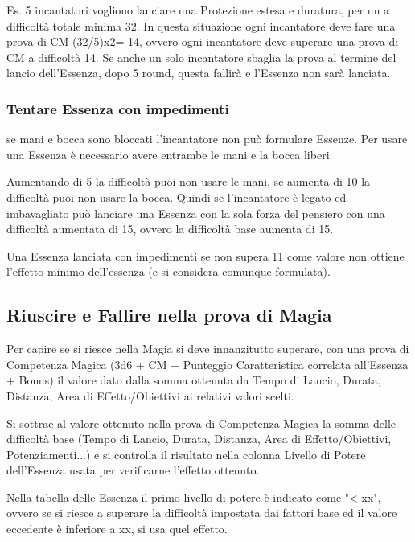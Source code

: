 \documentclass[a4paper,11pt,twoside,openany]{book}
\begin{document}
Es. 5 incantatori vogliono lanciare una Protezione estesa e duratura, per un a difficoltà totale minima 32. In questa situazione ogni incantatore deve fare una prova di CM (32/5)x2= 14, ovvero ogni incantatore deve superare una prova di CM a difficoltà 14. Se anche un solo incantatore sbaglia la prova al termine del lancio dell'Essenza, dopo 5 round, questa fallirà e l'Essenza non sarà lanciata.

\subsubsection{Tentare Essenza con impedimenti}

se mani e bocca sono bloccati l'incantatore non può formulare Essenze. Per usare una Essenza è necessario avere entrambe le mani e la bocca liberi.

Aumentando di 5 la difficoltà puoi non usare le mani, se aumenta di 10 la difficoltà puoi non usare la bocca. Quindi se l'incantatore è legato ed imbavagliato può lanciare una Essenza con la sola forza del pensiero con una difficoltà aumentata di 15, ovvero la difficoltà base aumenta di 15.

Una Essenza lanciata con impedimenti se non supera 11 come valore non ottiene l'effetto minimo dell'essenza (e si considera comunque formulata).

\subsection{Riuscire e Fallire nella prova di Magia}

\label{riuscire-e-fallire-nella-prova-di-magia}

Per capire se si riesce nella Magia si deve innanzitutto superare, con una prova di Competenza Magica (3d6 + CM + Punteggio Caratteristica correlata all'Essenza + Bonus) il valore dato dalla somma ottenuta da Tempo di Lancio, Durata, Distanza, Area di Effetto/Obiettivi ai relativi valori scelti.

Si sottrae al valore ottenuto nella prova di Competenza Magica la somma delle difficoltà base (Tempo di Lancio, Durata, Distanza, Area di Effetto/Obiettivi, Potenziamenti...) e si controlla il risultato nella colonna Livello di Potere dell'Essenza usata per verificarne l'effetto ottenuto.

Nella tabella delle Essenza il primo livello di potere è indicato come "< xx", ovvero se si riesce a superare la difficoltà impostata dai fattori base ed il valore eccedente è inferiore a xx, si usa quel effetto.
\end{document}
